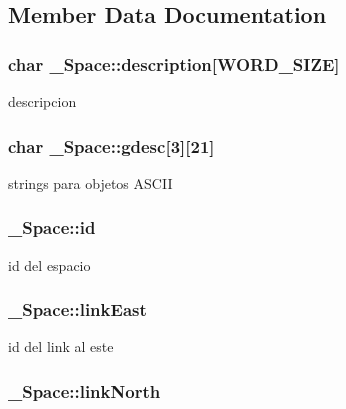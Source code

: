 \subsection{Member Data Documentation}
\hypertarget{struct__Space_a2a50aacb78d1d0f65f5b14f94ed81d80}{
\subsubsection[{description}]{\setlength{\rightskip}{0pt plus 5cm}char \+\_\+\+Space\+::description\mbox{[}{\bf W\+O\+R\+D\+\_\+\+S\+I\+Z\+E}\mbox{]}}}\label{struct__Space_a2a50aacb78d1d0f65f5b14f94ed81d80}
descripcion \hypertarget{struct__Space_a0a71c4c0a4a1698f7d860ba5b80beb7f}{
\subsubsection[{gdesc}]{\setlength{\rightskip}{0pt plus 5cm}char \+\_\+\+Space\+::gdesc\mbox{[}3\mbox{]}\mbox{[}21\mbox{]}}}\label{struct__Space_a0a71c4c0a4a1698f7d860ba5b80beb7f}
strings para objetos A\+S\+C\+I\+I \hypertarget{struct__Space_a70cb461deb9ac073e401b607339b567f}{
\subsubsection[{id}]{ \+\_\+\+Space\+::id}}\label{struct__Space_a70cb461deb9ac073e401b607339b567f}
id del espacio \hypertarget{struct__Space_adbf9d4d57d188ef48d3e361fb77a92cf}{
\subsubsection[{link\+East}]{ \+\_\+\+Space\+::link\+East}}\label{struct__Space_adbf9d4d57d188ef48d3e361fb77a92cf}
id del link al este \hypertarget{struct__Space_a3f2998ecc940b5cdab73e38188886902}{
\subsubsection[{link\+North}]{ \+\_\+\+Space\+::link\+North}}\label{struct__Space_a3f2998ecc940b5cdab73e38188886902}
